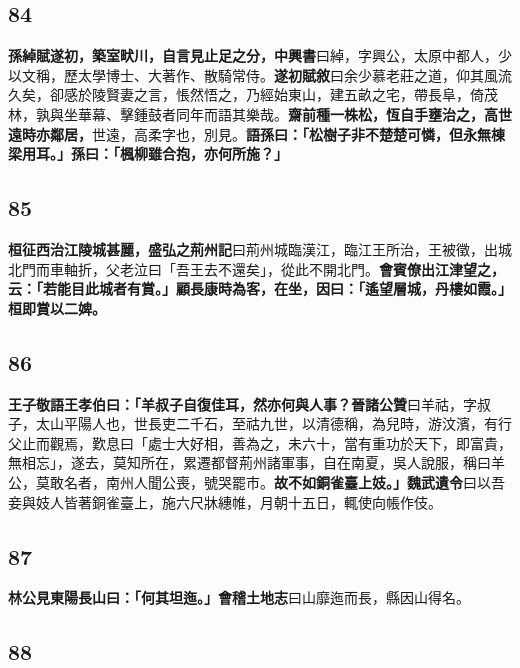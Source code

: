 \subsection*{84}

\textbf{孫綽賦遂初，築室畎川，自言見止足之分，}{\footnotesize \textbf{中興書}曰綽，字興公，太原中都人，少以文稱，歷太學博士、大著作、散騎常侍。\textbf{遂初賦敘}曰余少慕老莊之道，仰其風流久矣，卻感於陵賢妻之言，悵然悟之，乃經始東山，建五畝之宅，帶長阜，倚茂林，孰與坐華幕、擊鍾鼓者同年而語其樂哉。}\textbf{齋前種一株松，恆自手壅治之，高世遠時亦鄰居，}{\footnotesize 世遠，高柔字也，別見。}\textbf{語孫曰：「松樹子非不楚楚可憐，但永無棟梁用耳。」孫曰：「楓柳雖合抱，亦何所施？」}

\subsection*{85}

\textbf{桓征西治江陵城甚麗，}{\footnotesize \textbf{盛弘之荊州記}曰荊州城臨漢江，臨江王所治，王被徵，出城北門而車軸折，父老泣曰「吾王去不還矣」，從此不開北門。}\textbf{會賓僚出江津望之，云：「若能目此城者有賞。」顧長康時為客，在坐，因曰：「遙望層城，丹樓如霞。」桓即賞以二婢。}

\subsection*{86}

\textbf{王子敬語王孝伯曰：「羊叔子自復佳耳，然亦何與人事？}{\footnotesize \textbf{晉諸公贊}曰羊祜，字叔子，太山平陽人也，世長吏二千石，至祜九世，以清德稱，為兒時，游汶濱，有行父止而觀焉，歎息曰「處士大好相，善為之，未六十，當有重功於天下，即富貴，無相忘」，遂去，莫知所在，累遷都督荊州諸軍事，自在南夏，吳人說服，稱曰羊公，莫敢名者，南州人聞公喪，號哭罷市。}\textbf{故不如銅雀臺上妓。」}{\footnotesize \textbf{魏武遺令}曰以吾妾與妓人皆著銅雀臺上，施六尺牀繐帷，月朝十五日，輒使向帳作伎。}

\subsection*{87}

\textbf{林公見東陽長山曰：「何其坦迤。」}{\footnotesize \textbf{會稽土地志}曰山靡迤而長，縣因山得名。}

\subsection*{88}


